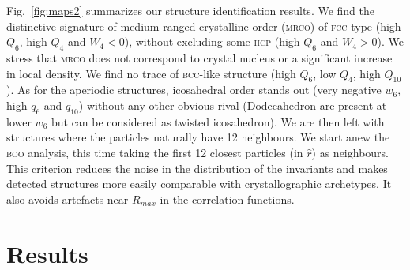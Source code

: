 \documentclass{revtex4-1}
\begin{document}
Fig.~\ref{fig:maps2} summarizes our structure identification results. We find the distinctive signature of medium ranged crystalline order (\textsc{mrco}) of \textsc{fcc} type (high $Q_6$, high $Q_4$ and $W_4<0$), without excluding some \textsc{hcp} (high $Q_6$ and $W_4>0$). We stress that \textsc{mrco} does not correspond to crystal nucleus or a significant increase in local density. We find no trace of \textsc{bcc}-like structure (high $Q_6$, low $Q_4$, high $Q_{10}$). As for the aperiodic structures, icosahedral order stands out (very negative $w_6$, high $q_6$ and $q_{10}$) without any other obvious rival (Dodecahedron are present at lower $w_6$ but can be considered as twisted icosahedron). We are then left with structures where the particles naturally have 12 neighbours. We start anew the \textsc{boo} analysis, this time taking the first 12 closest particles (in $\hat{r}$) as neighbours. This criterion reduces the noise in the distribution of the invariants and makes detected structures more easily comparable with crystallographic archetypes. It also avoids artefacts near $R_{max}$ in the correlation functions.

\section*{Results}
\end{document}

